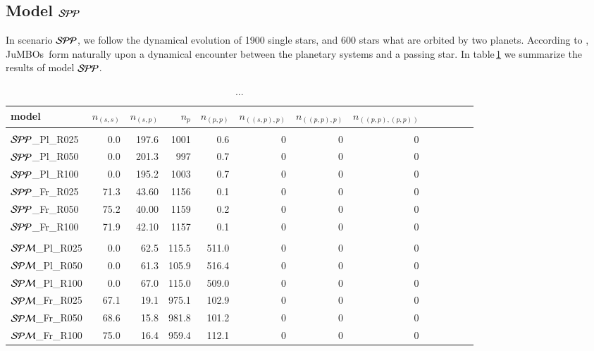 \documentclass[aa]{lib/aa}
\newcommand{\jumbos}{\mbox{JuMBOs}}
\begin{document}
\subsection{Model ${\cal SPP}$}

In scenario ${\cal SPP}$, we follow the dynamical evolution of 1900
single stars, and 600 stars what are orbited by two planets.
According to \cite{2023arXiv231006016W}, \jumbos\, form naturally upon a
dynamical encounter between the planetary systems and a passing star.
In table\,\ref{Tab:model_PP} we summarize the results of model ${\cal
  SPP}$.

\begin{table}
 \caption{...}
 \label{Tab:model_PP}
 \centering 
 \begin{tabular}{lrrrrrrrrrrrr}
   \hline\hline
   model & $n_{(s,s)}$ & $n_{(s,p)}$ & $n_{p}$ & $n_{(p,p)}$ &  $n_{((s,p),p)}$ & $n_{((p,p),p)}$ & $n_{((p,p),(p,p))}$  \\
        \hline \vspace{-0.75em}\\
${\cal SPP}$\_Pl\_R025 &  0.0 & 197.6 & 1001 & 0.6 & 0 & 0 & 0 \\
${\cal SPP}$\_Pl\_R050 &  0.0 & 201.3 &  997 & 0.7 & 0 & 0 & 0 \\
${\cal SPP}$\_Pl\_R100 &  0.0 & 195.2 & 1003 & 0.7 & 0 & 0 & 0 \\
${\cal SPP}$\_Fr\_R025 & 71.3 & 43.60 & 1156 & 0.1 & 0 & 0 & 0 \\
${\cal SPP}$\_Fr\_R050 & 75.2 & 40.00 & 1159 & 0.2 & 0 & 0 & 0 \\
${\cal SPP}$\_Fr\_R100 & 71.9 & 42.10 & 1157 & 0.1 & 0 & 0 & 0 \\
 \hline
  \hline \vspace{-0.75em}\\
${\cal SPM}$\_Pl\_R025 & 0.0 & 62.5 & 115.5 & 511.0 & 0 & 0 & 0 \\
${\cal SPM}$\_Pl\_R050 & 0.0 & 61.3 & 105.9 & 516.4 & 0 & 0 & 0 \\
${\cal SPM}$\_Pl\_R100 & 0.0 & 67.0 & 115.0 & 509.0 & 0 & 0 & 0 \\
${\cal SPM}$\_Fr\_R025 & 67.1 & 19.1 & 975.1 & 102.9 & 0 & 0 & 0 \\
${\cal SPM}$\_Fr\_R050 & 68.6 & 15.8 & 981.8 & 101.2 & 0 & 0 & 0 \\
${\cal SPM}$\_Fr\_R100 & 75.0 & 16.4 & 959.4 & 112.1 & 0 & 0 & 0 \\
  \hline
 \end{tabular}
\end{table}
\end{document}
